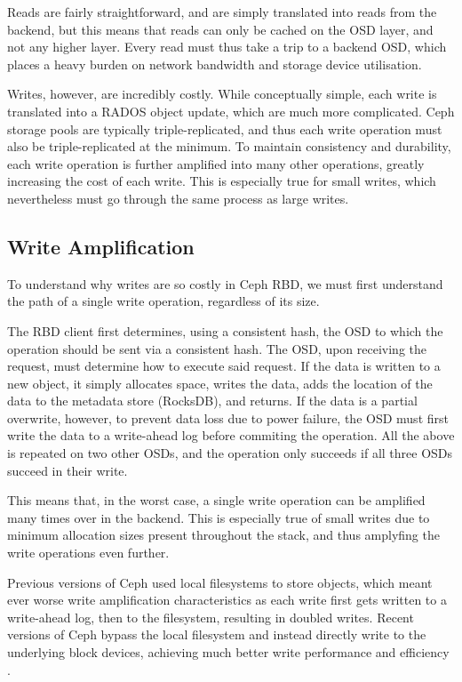 Reads are fairly straightforward, and are simply translated into reads from the
backend, but this means that reads can only be cached on the OSD layer, and
not any higher layer. Every read must thus take a trip to a backend OSD, which
places a heavy burden on network bandwidth and storage device utilisation.

Writes, however, are incredibly costly. While conceptually simple, each write is
translated into a RADOS object update, which are much more complicated.  Ceph
storage pools are typically triple-replicated, and thus each write operation
must also be triple-replicated at the minimum. To maintain consistency and
durability, each write operation is further amplified into many other
operations, greatly increasing the cost of each write. This is especially true
for small writes, which nevertheless must go through the same process as large
writes.

\subsection{Write Amplification}

To understand why writes are so costly in Ceph RBD, we must first understand
the path of a single write operation, regardless of its size.

The RBD client first determines, using a consistent hash, the OSD to which the
operation should be sent via a consistent hash. The OSD, upon receiving the
request, must determine how to execute said request. If the data is written to a
new object, it simply allocates space, writes the data, adds the location of the
data to the metadata store (RocksDB), and returns. If the data is a partial
overwrite, however, to prevent data loss due to power failure, the OSD must
first write the data to a write-ahead log before commiting the operation. All
the above is repeated on two other OSDs, and the operation only succeeds if
all three OSDs succeed in their write.

This means that, in the worst case, a single write operation can be amplified
many times over in the backend. This is especially true of small writes due to
minimum allocation sizes present throughout the stack, and thus amplyfing the
write operations even further.

Previous versions of Ceph used local filesystems to store objects, which meant
ever worse write amplification characteristics as each write first gets written
to a write-ahead log, then to the filesystem, resulting in doubled writes.
Recent versions of Ceph bypass the local filesystem and instead directly write
to the underlying block devices, achieving much better write performance and
efficiency \cite{aghayev2019file}.

